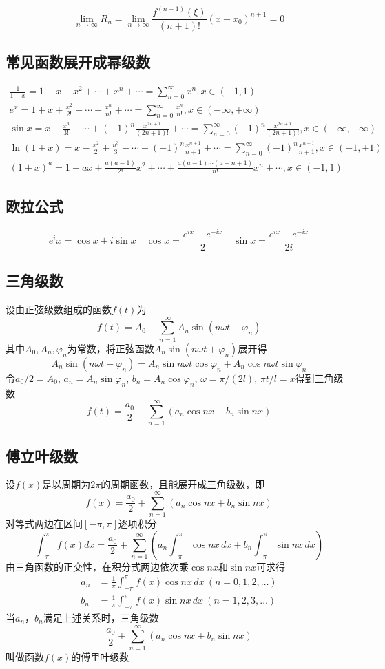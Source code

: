 \documentclass[a4paper,zihao=-4,UTF8]{ctexbook}
\begin{document}
\[\lim_{n\to\infty}R_n=\lim_{n\to\infty}\frac{f^{(n+1)}(\xi)}{(n+1) !}\left(x-x_{0}\right)^{n+1}=0\]

\subsection{常见函数展开成幂级数}
\begin{gather*}
    \frac{1}{1-x} =1+x+x^2+\cdots+x^n+\cdots=\sum_{n=0}^\infty x^n,x\in(-1,1)\\
    e^x=1+x+\frac{x^2}{2!}+\cdots+\frac{x^n}{n!}+\cdots=\sum_{n=0}^\infty \frac{x^n}{n!},x\in(-\infty,+\infty)\\
    \sin x=x-\frac{x^3}{3!}+\cdots+(-1)^n\frac{x^{2n+1}}{(2n+1)!}+\cdots=\sum_{n=0}^\infty (-1)^n\frac{x^{2n+1}}{(2n+1)!},x\in(-\infty,+\infty)\\
    \ln(1+x)=x-\frac{x^2}{2}+\frac{u^3}{3}-\cdots+(-1)^n\frac{x^{n+1}}{n+1}+\cdots=\sum_{n=0}^\infty (-1)^n\frac{x^{n+1}}{n+1},x\in(-1,+1)\\
    (1+x)^a=1+ax+\frac{a(a-1)}{2!}x^2+\cdots+\frac{a(a-1)\cdots(a-n+1)}{n!}x^n+\cdots,x\in(-1,1)
\end{gather*}

\subsection{欧拉公式}
\[e^ix=\cos x+i\sin x\quad \cos x=\frac{e^{ix}+e^{-ix}}{2}\quad \sin x=\frac{e^{ix}-e^{-ix}}{2i}\]
\subsection{三角级数}
设由正弦级数组成的函数$f(t)$为
\[f(t)=A_0+\sum_{n=1}^\infty A_n\sin (n\omega t+\varphi_n)\]
其中$A_0,A_n,\varphi_n$为常数，将正弦函数$A_n\sin (n\omega t+\varphi_n)$展开得
\[A_n\sin (n\omega t+\varphi_n)=A_n\sin n\omega t\cos \varphi_n+A_n\cos n\omega t\sin \varphi_n\]
令$a_0/2=A_0$, $a_n=A_n\sin \varphi_n$, $b_n=A_n\cos \varphi_n$,
$\omega=\pi/(2l)$, $\pi t/l=x$得到三角级数
\[f(t)=\frac{a_0}{2}+\sum_{n=1}^\infty \left(a_n\cos nx+b_n\sin nx \right)\]
\subsection{傅立叶级数}
设$f(x)$是以周期为$2\pi$的周期函数，且能展开成三角级数，即
\[f(x)=\frac{a_0}{2}+\sum_{n=1}^\infty \left(a_n\cos nx+b_n\sin nx \right)\]
对等式两边在区间$[-\pi,\pi]$逐项积分
\[\int_{-\pi}^\pi f(x)dx=\frac{a_0}{2}+\sum_{n=1}^\infty \left(a_n
\int_{-\pi}^\pi \cos nx\, dx+b_n \int_{-\pi}^\pi \sin nx\, dx\right)\]
由三角函数的正交性，在积分式两边依次乘$\cos nx$和$\sin nx$可求得
\begin{align*}
    a_n&=\frac 1\pi \int_{-\pi}^\pi f(x)\cos nx\, dx\ (n=0,1,2,\ldots)\\
    b_n&=\frac 1\pi \int_{-\pi}^\pi f(x)\sin nx\, dx\ (n=1,2,3,\ldots)
\end{align*}
当$a_n$，$b_n$满足上述关系时，三角级数
\[\frac{a_0}{2}+\sum_{n=1}^\infty \left(a_n\cos nx+b_n\sin nx \right)\]
叫做函数$f(x)$的傅里叶级数
\end{document}
